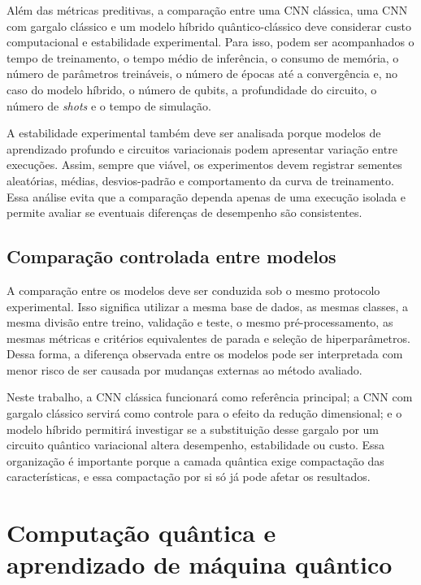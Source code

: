 \documentclass[
    12pt,
    openright,
    oneside,
    a4paper,
    english,
    brazil
]{abntex2}
\begin{document}
Além das métricas preditivas, a comparação entre uma CNN clássica, uma CNN com gargalo clássico e um modelo híbrido quântico-clássico deve considerar custo computacional e estabilidade experimental. Para isso, podem ser acompanhados o tempo de treinamento, o tempo médio de inferência, o consumo de memória, o número de parâmetros treináveis, o número de épocas até a convergência e, no caso do modelo híbrido, o número de qubits, a profundidade do circuito, o número de \textit{shots} e o tempo de simulação.

A estabilidade experimental também deve ser analisada porque modelos de aprendizado profundo e circuitos variacionais podem apresentar variação entre execuções. Assim, sempre que viável, os experimentos devem registrar sementes aleatórias, médias, desvios-padrão e comportamento da curva de treinamento. Essa análise evita que a comparação dependa apenas de uma execução isolada e permite avaliar se eventuais diferenças de desempenho são consistentes.

\subsection{Comparação controlada entre modelos}
\label{subsec:comparacao_controlada_modelos}

A comparação entre os modelos deve ser conduzida sob o mesmo protocolo experimental. Isso significa utilizar a mesma base de dados, as mesmas classes, a mesma divisão entre treino, validação e teste, o mesmo pré-processamento, as mesmas métricas e critérios equivalentes de parada e seleção de hiperparâmetros. Dessa forma, a diferença observada entre os modelos pode ser interpretada com menor risco de ser causada por mudanças externas ao método avaliado.

Neste trabalho, a CNN clássica funcionará como referência principal; a CNN com gargalo clássico servirá como controle para o efeito da redução dimensional; e o modelo híbrido permitirá investigar se a substituição desse gargalo por um circuito quântico variacional altera desempenho, estabilidade ou custo. Essa organização é importante porque a camada quântica exige compactação das características, e essa compactação por si só já pode afetar os resultados.


\section{Computação quântica e aprendizado de máquina quântico}
\end{document}
